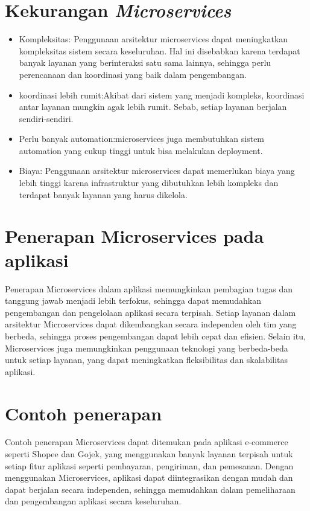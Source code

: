	
	\section{Kekurangan \textit{Microservices}}
		\begin{itemize}
		\item Kompleksitas: Penggunaan arsitektur microservices dapat meningkatkan kompleksitas sistem secara keseluruhan. Hal ini disebabkan karena terdapat banyak layanan yang berinteraksi satu sama lainnya, sehingga perlu perencanaan dan koordinasi yang baik dalam pengembangan.
		\item koordinasi lebih rumit:Akibat dari sistem yang menjadi kompleks, koordinasi antar layanan mungkin agak lebih rumit. Sebab, setiap layanan berjalan sendiri-sendiri.
		\item Perlu banyak automation:microservices juga membutuhkan sistem automation yang cukup tinggi untuk bisa melakukan deployment.
		\item Biaya: Penggunaan arsitektur microservices dapat memerlukan biaya yang lebih tinggi karena infrastruktur yang dibutuhkan lebih kompleks dan terdapat banyak layanan yang harus dikelola.
		\end{itemize}
	
	\section{Penerapan Microservices pada aplikasi}
	
	Penerapan Microservices dalam aplikasi memungkinkan pembagian tugas dan tanggung jawab menjadi lebih terfokus, sehingga dapat memudahkan pengembangan dan pengelolaan aplikasi secara terpisah. Setiap layanan dalam arsitektur Microservices dapat dikembangkan secara independen oleh tim yang berbeda, sehingga proses pengembangan dapat lebih cepat dan efisien. Selain itu, Microservices juga memungkinkan penggunaan teknologi yang berbeda-beda untuk setiap layanan, yang dapat meningkatkan fleksibilitas dan skalabilitas aplikasi.
	
	
	\section{Contoh penerapan}
	Contoh penerapan Microservices dapat ditemukan pada aplikasi e-commerce seperti Shopee dan Gojek, yang menggunakan banyak layanan terpisah untuk setiap fitur aplikasi seperti pembayaran, pengiriman, dan pemesanan. Dengan menggunakan Microservices, aplikasi dapat diintegrasikan dengan mudah dan dapat berjalan secara independen, sehingga memudahkan dalam pemeliharaan dan pengembangan aplikasi secara keseluruhan.
	

